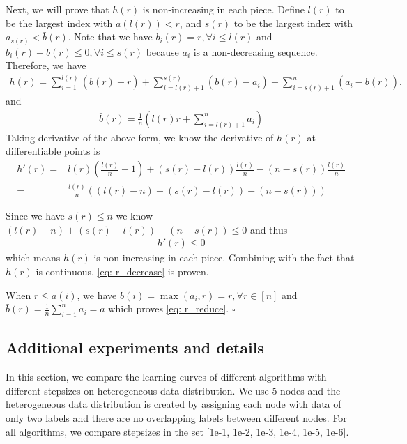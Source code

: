 \documentclass{article} %
\begin{document}
Next, we will prove that $h(r)$ is  non-increasing in each piece.
Define $ l(r)$ to be the largest index with $a(l(r)) < r$, and $s(r)$ to be the largest index with $a_{s(r)} < \bar b(r)$. Note that we have $b_i(r) = r, \forall i \leq l(r)$ and $b_i(r) - \bar b(r) \leq 0, \forall i \leq s(r)$ because $a_i$ is a non-decreasing sequence. Therefore, we have 
\begin{align}
h(r) = \sum_{i=1}^{l(r)} (\bar b(r) - r) + \sum_{i= l(r)+1} ^{s(r) } (\bar b(r) - a_i) + \sum_{i= s(r)+1}^n (a_i - \bar b(r)).
\end{align}
and 
\begin{align}
\bar b(r) = \frac{1}{n}\left (l(r) r + \sum_{i=l(r)+1}^n a_i\right)
\end{align}
Taking derivative of the above form, we know the derivative of $h(r)$ at differentiable points is
\begin{align}
h'(r) = &l(r) (\frac{l(r)}{n}-1) + (s(r)-l(r)) \frac{l(r)}{n} - (n-s(r)) \frac{l(r)}{n} \nonumber \\
= & \frac{l(r)}{n} ((l(r) - n) + (s(r) - l(r)) - (n-s(r)))
\end{align}

Since we have $s(r) \leq n$ we know $(l(r) - n) + (s(r) - l(r)) - (n-s(r)) \leq 0$ and thus
\begin{align}
h'(r) \leq 0
\end{align}
which means $h(r)$ is non-increasing in each piece. Combining with the fact that $h(r)$ is continuous, \eqref{eq: r_decrease} is proven.

When $r \leq a(i)$, we have $b(i) = \max(a_i,r) = r, \forall r \in [n]$ and $\bar b(r) = \frac{1}{n}\sum_{i=1}^n a_i = \bar a$ which proves \eqref{eq: r_reduce}.
\hfill $\square$

\subsection{Additional experiments and details}\label{app: experiments}
In this section, we compare the learning curves of different algorithms with different stepsizes on heterogeneous data distribution. We use 5 nodes and the heterogeneous data distribution is created by assigning each node with data of only two labels and there are no overlapping labels between different nodes. For all algorithms, we compare stepsizes in the set [1e-1, 1e-2, 1e-3, 1e-4, 1e-5, 1e-6]. 
\end{document}

